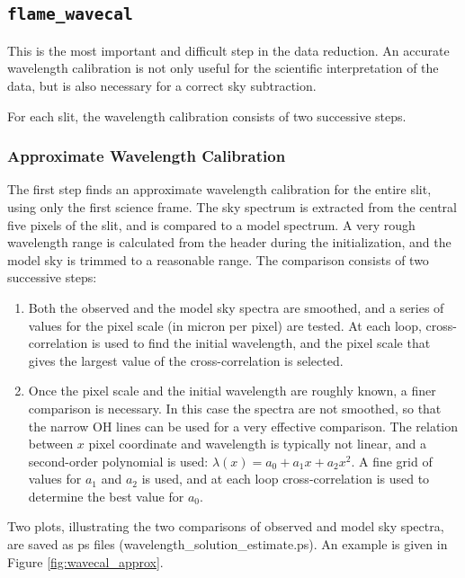 \documentclass[a4paper, notitlepage]{article}
\begin{document}
\subsection{\texttt{flame\_wavecal}}

This is the most important and difficult step in the data reduction. An accurate wavelength calibration is not only useful for the scientific interpretation of the data, but is also necessary for a correct sky subtraction. 

For each slit, the wavelength calibration consists of two successive steps.


\subsubsection{Approximate Wavelength Calibration}

The first step finds an approximate wavelength calibration for the entire slit, using only the first science frame. The sky spectrum is extracted from the central five pixels of the slit, and is compared to a model spectrum. A very rough wavelength range is calculated from the header during the initialization, and the model sky is trimmed to a reasonable range. The comparison consists of two successive steps:
\begin{enumerate}
\item Both the observed and the model sky spectra are smoothed, and a series of values for the pixel scale (in micron per pixel) are tested. At each loop, cross-correlation is used to find the initial wavelength, and the pixel scale that gives the largest value of the cross-correlation is selected.
\item Once the pixel scale and the initial wavelength are roughly known, a finer comparison is necessary. In this case the spectra are not smoothed, so that the narrow OH lines can be used for a very effective comparison. The relation between $x$ pixel coordinate and wavelength is typically not linear, and a second-order polynomial is used: $\lambda(x) = a_0 + a_1 x + a_2 x^2$. A fine grid of values for $a_1$ and $a_2$ is used, and at each loop cross-correlation is used to determine the best value for $a_0$.
\end{enumerate}

Two plots, illustrating the two comparisons of observed and model sky spectra, are saved as ps files (wavelength\_solution\_estimate.ps). An example is given in Figure \ref{fig:wavecal_approx}.
\end{document}
